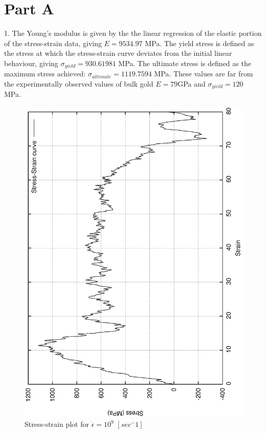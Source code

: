 \documentclass{article}
\begin{document}
\section{Part A}

1. The Young's modulus is given by the the linear regression of the elastic portion of the stress-strain data, giving $E=9534.97$ MPa. The yield stress is defined as the stress at which the stress-strain curve deviates from the initial linear behaviour, giving $\sigma_{yield}=930.61981$ MPa. The ultimate stress is defined as the maximum stress achieved: $\sigma_{ultimate}=1119.7594$ MPa. These values are far from the experimentally observed values of bulk gold $E=79$GPa and $\sigma_{yield}=120$ MPa. \\
\begin{figure}[h!]
\centering
\includegraphics[totalheight=0.5\textheight, angle=-90]{se_curve1}
\caption{Stress-strain plot for $\dot{\epsilon}=10^9$ $[sec^-1]$}
\label{fig:aNicePicture}
\end{figure}
\end{document}
